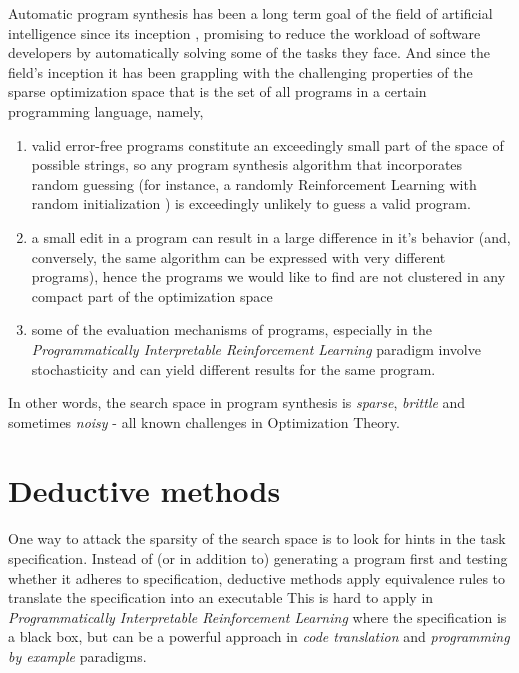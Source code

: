 Automatic program synthesis has been a long term goal of the field of artificial intelligence since its inception \cite{mannaAutomaticProgramSynthesis1971}, promising to reduce the workload of software developers by automatically solving some of the tasks they face.
And since the field's inception it has been grappling with the challenging properties of the sparse optimization space \cite{alurSyntaxguidedSynthesis2013, davidProgramSynthesisChallenges2017} that is the set of all programs in a certain programming language, namely, 
\begin{enumerate}
    \item valid error-free programs constitute an exceedingly small part of the space of possible strings, so any program synthesis algorithm that incorporates random guessing (for instance, a randomly Reinforcement Learning with random initialization \cite{suttonReinforcementLearningSecond2018}) is exceedingly unlikely to guess a valid program.
    \item a small edit in a program can result in a large difference in it's behavior (and, conversely, the same algorithm can be expressed with very different programs), hence the programs we would like to find are not clustered in any compact part of the optimization space
    \item some of the evaluation mechanisms of programs, especially in the \emph{Programmatically Interpretable Reinforcement Learning} paradigm involve stochasticity and can yield different results for the same program.
\end{enumerate}

In other words, the search space in program synthesis is \emph{sparse}, \emph{brittle} and sometimes \emph{noisy} \cite{arnoldNoisyOptimizationEvolution2002} - all known challenges in Optimization Theory.

\section{Deductive methods}

One way to attack the sparsity of the search space is to look for hints in the task specification. 
Instead of (or in addition to) generating a program first and testing whether it adheres to specification, deductive methods apply equivalence rules to translate the specification into an executable 
This is hard to apply in \emph{Programmatically Interpretable Reinforcement Learning} where the specification is a black box, but can be a powerful approach in \emph{code translation} and \emph{programming by example} paradigms.

